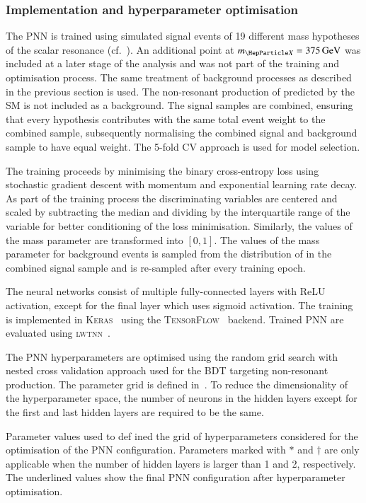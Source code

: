 \subsubsection{Implementation and hyperparameter optimisation}

The PNN is trained using simulated signal events of 19 different mass
hypotheses of the scalar resonance (cf.~). An
additional point at $\mX = \SI{375}{\GeV}$ was included at a later
stage of the analysis and was not part of the training and
optimisation process. The same treatment of background processes as
described in the previous section is used. The non-resonant production
of \HH predicted by the SM is not included as a background.
The signal samples are combined, ensuring that every \mX hypothesis
contributes with the same total event weight to the combined sample,
subsequently normalising the combined signal and background sample to
have equal weight. The 5-fold CV approach is used for model selection.

The training proceeds by minimising the binary cross-entropy loss
using stochastic gradient descent with momentum and exponential
learning rate decay. As part of the training process the
discriminating variables are centered and scaled by subtracting the
median and dividing by the interquartile range of the variable for
better conditioning of the loss minimisation. Similarly, the values of
the mass parameter are transformed into $[0, 1]$. The values of the
mass parameter for background events is sampled from the distribution
of \mX in the combined signal sample and is re-sampled after every
training epoch.

The neural networks consist of multiple fully-connected layers with
ReLU activation, except for the final layer which uses sigmoid
activation. The training is implemented in \textsc{Keras}~\cite{keras}
using the \textsc{TensorFlow}~\cite{tensorflow2015-whitepaper}
backend. Trained PNN are evaluated using \textsc{lwtnn}~\cite{lwtnn}.

The PNN hyperparameters are optimised using the random grid search
with nested cross validation approach used for the BDT targeting
non-resonant \HH production. The parameter grid is defined
in~. To reduce the dimensionality of
the hyperparameter space, the number of neurons in the hidden layers
except for the first and last hidden layers are required to be the
same.

\begin{table}[htbp]
  \centering

  \caption{Parameter values used to def ined the grid of
    hyperparameters considered for the optimisation of the PNN
    configuration. Parameters marked with $*$ and $\dagger$ are only
    applicable when the number of hidden layers is larger than 1 and
    2, respectively. The underlined values show the final PNN
    configuration after hyperparameter optimisation.}%
  \label{tab:hyperparameter_grid_pnn}

  
\end{table}

